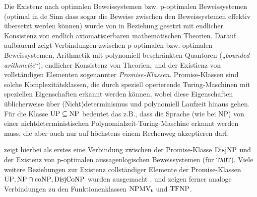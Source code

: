 Die Existenz nach optimalen Beweissystemen bzw. p-optimalen Beweissystemen (optimal in de Sinn dass sogar die Beweise zwischen den Beweissystemen effektiv übersetzt werden können) wurde von \textcite{krajicek_propositional_1989} in Beziehung gesetzt mit endlicher Konsistenz von endlich axiomatisierbaren mathematischen Theorien. Darauf aufbauend zeigt \textcite{pudlak_incompleteness_2017} Verbindungen zwischen p-optimalen bzw. optimalen Beweissystemen, Arithmetik mit polynomiell beschränkten Quantoren („\emph{bounded arithmetic}“), endlicher Konsistenz von Theorien, und der Existienz von vollständigen Elementen sogenannter \emph{Promise-Klassen}. Promise-Klassen sind solche Komplexitätsklassen, die durch speziell operierende Turing-Maschinen mit speziellen Eigenschaften erkannt werden können, wobei diese Eigenschaften üblicherweise über (Nicht)determinismus und polynomiell Laufzeit hinaus gehen. Für die Klasse $\mathrm{UP}\subseteq\mathrm{NP}$ bedeutet das z.B., dass die Sprache (wie bei NP) von einer nichtdeterministischen Polynomialzeit-Turing-Maschine erkannt werden muss, die aber auch nur auf höchstens einem Rechenweg akzeptieren darf.

\textcite{razborov_provably_1994} zeigt hierbei als erstes eine Verbindung zwischen der Promise-Klasse $\mathrm{DisjNP}$ und der Existenz von p-optimalen aussagenlogischen Beweissystemen (für $\mathtt{TAUT}$). Viele weitere Beziehungen zur Existenz collständiger Elemente der Promise-Klassen $\mathrm{UP}, \mathrm{NP}\cap\mathrm{coNP}, \mathrm{DisjCoNP}$ wurden ausgemacht \parencites(vgl. auch)(){messner_simulation_2001}{kobler_optimal_2003}{beyersdorff_there_2011}.
\textcite{beyersdorff_nondeterministic_2009} und \textcite{pudlak_incompleteness_2017} zeigen ferner analoge Verbindungen zu den Funktionenklassen $\mathrm{NPMV_t}$ und $\mathrm{TFNP}$.

